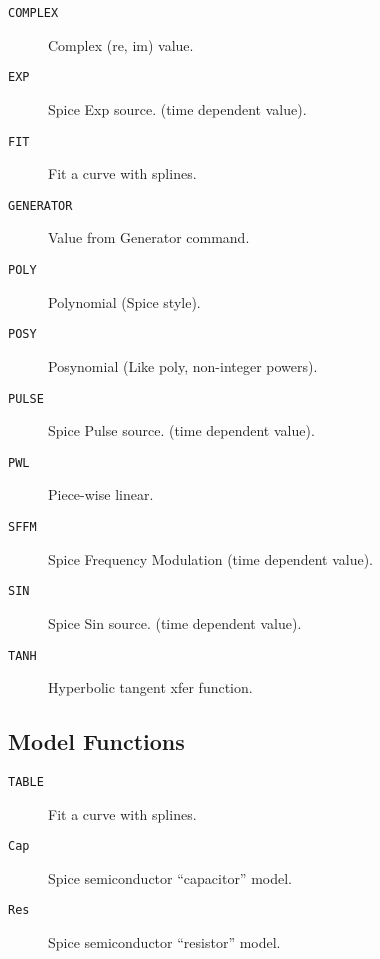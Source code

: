 \begin{description}

\item[{\tt COMPLEX}] Complex (re, im) value.
\item[{\tt EXP}] Spice Exp source.  (time dependent value).
\item[{\tt FIT}] Fit a curve with splines.
\item[{\tt GENERATOR}] Value from Generator command.
\item[{\tt POLY}] Polynomial (Spice style).
\item[{\tt POSY}] Posynomial (Like poly, non-integer powers).
\item[{\tt PULSE}] Spice Pulse source.  (time dependent value).
\item[{\tt PWL}] Piece-wise linear.
\item[{\tt SFFM}] Spice Frequency Modulation (time dependent value).
\item[{\tt SIN}] Spice Sin source.  (time dependent value).
\item[{\tt TANH}] Hyperbolic tangent xfer function.

\end{description}

\subsection*{Model Functions}

\begin{description}

\item[{\tt TABLE}] Fit a curve with splines.
\item[{\tt Cap}] Spice semiconductor ``capacitor'' model.
\item[{\tt Res}] Spice semiconductor ``resistor'' model.

\end{description}
